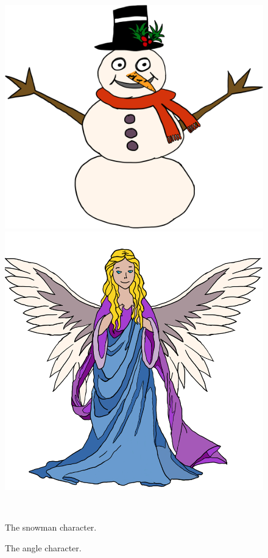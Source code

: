 \begin{figure}[htbp] \centering
\begin{minipage}[b]{0.45\textwidth} \centering
\includegraphics[width=1.00\textwidth]{Pictures/Design/snowman} %
\end{minipage} \hfill
\begin{minipage}[b]{0.45\textwidth} \centering
\includegraphics[width=1.00\textwidth]{Pictures/Design/Angel} %
\end{minipage} \\ %
\begin{minipage}[t]{0.45\textwidth}
\caption{The snowman character.} %
\label{fig:PixieGirl}
\end{minipage} \hfill
\begin{minipage}[t]{0.45\textwidth}
\caption{The angle character.} %
\label{fig:Angel}
\end{minipage}
\end{figure}

